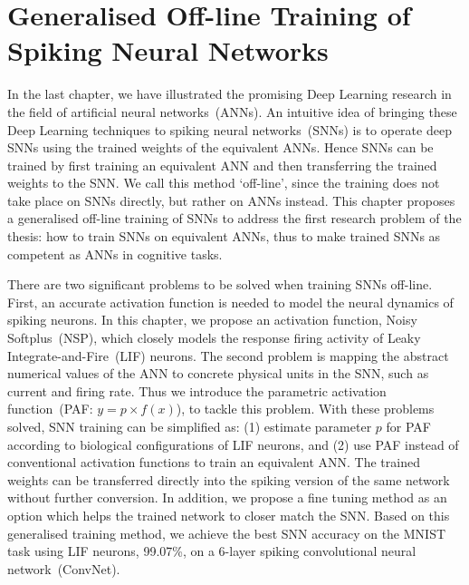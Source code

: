 \chapter{Generalised Off-line Training of Spiking Neural Networks}
\label{cha:Conv}

In the last chapter, we have illustrated the promising Deep Learning research in the field of artificial neural networks~(ANNs). 
An intuitive idea of bringing these Deep Learning techniques to spiking neural networks~(SNNs) is to operate deep SNNs using the trained weights of the equivalent ANNs.
Hence SNNs can be trained by first training an equivalent ANN and then transferring the trained weights to the SNN.
We call this method `off-line', since the training does not take place on SNNs directly, but rather on ANNs instead.
This chapter proposes a generalised off-line training of SNNs to address the first research problem of the thesis: how to train SNNs on equivalent ANNs, thus to make trained SNNs as competent as ANNs in cognitive tasks. 


There are two significant problems to be solved when training SNNs off-line.
First, an accurate activation function is needed to model the neural dynamics of spiking neurons.
In this chapter, we propose an activation function, 
Noisy Softplus~(NSP), which closely models the response firing activity of Leaky Integrate-and-Fire~(LIF) neurons.
The second problem is mapping the abstract numerical values of the ANN to concrete physical units in the SNN, such as current and firing rate.
Thus we introduce the parametric activation function~(PAF: $y = p \times f(x)$), to tackle this problem.
With these problems solved, SNN training can be simplified as: (1) estimate parameter $p$ for PAF according to biological configurations of LIF neurons, and (2) use PAF instead of conventional activation functions to train an equivalent ANN.
The trained weights can be transferred directly into the spiking version of the same network without further conversion.
In addition, we propose a fine tuning method as an option which helps the trained network to closer match the SNN.
Based on this generalised training method, we achieve the best SNN accuracy on the MNIST task using LIF neurons, 99.07\%, on a 6-layer spiking convolutional neural network~(ConvNet).

